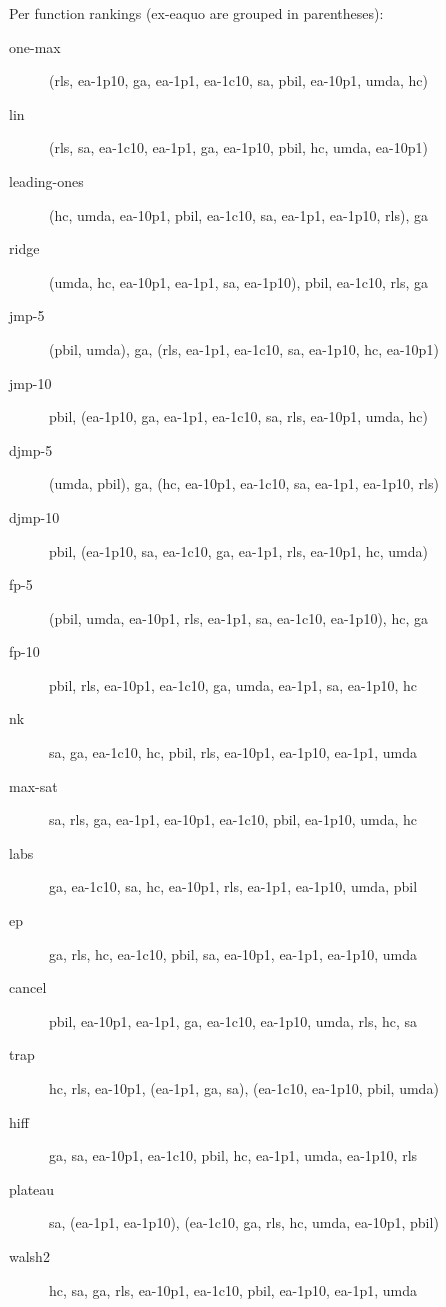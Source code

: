 Per function rankings (ex-eaquo are grouped in parentheses):
\begin{description}
\item[one-max]
(rls, ea-1p10, ga, ea-1p1, ea-1c10, sa, pbil, ea-10p1, umda, hc)

\item[lin]
(rls, sa, ea-1c10, ea-1p1, ga, ea-1p10, pbil, hc, umda, ea-10p1)

\item[leading-ones]
(hc, umda, ea-10p1, pbil, ea-1c10, sa, ea-1p1, ea-1p10, rls), ga

\item[ridge]
(umda, hc, ea-10p1, ea-1p1, sa, ea-1p10), pbil, ea-1c10, rls, ga

\item[jmp-5]
(pbil, umda), ga, (rls, ea-1p1, ea-1c10, sa, ea-1p10, hc, ea-10p1)

\item[jmp-10]
pbil, (ea-1p10, ga, ea-1p1, ea-1c10, sa, rls, ea-10p1, umda, hc)

\item[djmp-5]
(umda, pbil), ga, (hc, ea-10p1, ea-1c10, sa, ea-1p1, ea-1p10, rls)

\item[djmp-10]
pbil, (ea-1p10, sa, ea-1c10, ga, ea-1p1, rls, ea-10p1, hc, umda)

\item[fp-5]
(pbil, umda, ea-10p1, rls, ea-1p1, sa, ea-1c10, ea-1p10), hc, ga

\item[fp-10]
pbil, rls, ea-10p1, ea-1c10, ga, umda, ea-1p1, sa, ea-1p10, hc

\item[nk]
sa, ga, ea-1c10, hc, pbil, rls, ea-10p1, ea-1p10, ea-1p1, umda

\item[max-sat]
sa, rls, ga, ea-1p1, ea-10p1, ea-1c10, pbil, ea-1p10, umda, hc

\item[labs]
ga, ea-1c10, sa, hc, ea-10p1, rls, ea-1p1, ea-1p10, umda, pbil

\item[ep]
ga, rls, hc, ea-1c10, pbil, sa, ea-10p1, ea-1p1, ea-1p10, umda

\item[cancel]
pbil, ea-10p1, ea-1p1, ga, ea-1c10, ea-1p10, umda, rls, hc, sa

\item[trap]
hc, rls, ea-10p1, (ea-1p1, ga, sa), (ea-1c10, ea-1p10, pbil, umda)

\item[hiff]
ga, sa, ea-10p1, ea-1c10, pbil, hc, ea-1p1, umda, ea-1p10, rls

\item[plateau]
sa, (ea-1p1, ea-1p10), (ea-1c10, ga, rls, hc, umda, ea-10p1, pbil)

\item[walsh2]
hc, sa, ga, rls, ea-10p1, ea-1c10, pbil, ea-1p10, ea-1p1, umda

\end{description}
